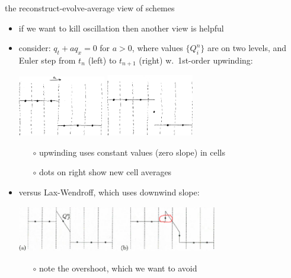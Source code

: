 \documentclass[10pt,hyperref,dvipsnames]{beamer}
\begin{document}
\begin{frame}{the reconstruct-evolve-average view of schemes}

\begin{itemize}
\item if we want to kill oscillation then another view is helpful
\item consider: $q_t + a q_x=0$ for $a>0$, where values $\{Q_i^n\}$ are on two levels, and Euler step from $t_n$ (left) to $t_{n+1}$ (right) w.~1st-order upwinding:

\begin{center}
\quad \includegraphics[width=0.3\textwidth]{figs/upreconstructleft} \qquad \includegraphics[width=0.3\textwidth]{figs/upreconstructright}
\end{center}

    \begin{itemize}
    \item[$\circ$] upwinding uses constant values (zero slope) in cells
    \item[$\circ$] dots on right show new cell averages
    \end{itemize}
\item versus Lax-Wendroff, which uses downwind slope:

\begin{center}
\includegraphics[width=0.69\textwidth]{figs/leveque6p4}
\end{center}

    \begin{itemize}
    \item[$\circ$] note the \alert{overshoot}, which we want to avoid
    \end{itemize}
\end{itemize}
\end{frame}
\end{document}
